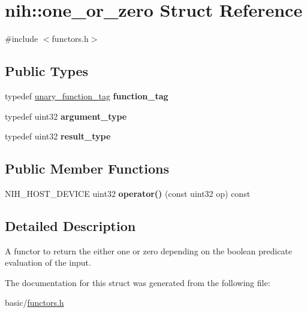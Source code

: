 \hypertarget{structnih_1_1one__or__zero}{
\section{nih\-:\-:one\-\_\-or\-\_\-zero \-Struct \-Reference}
\label{structnih_1_1one__or__zero}
}


{\ttfamily \#include $<$functors.\-h$>$}

\subsection*{\-Public \-Types}
\begin{DoxyCompactItemize}
\item 
\hypertarget{structnih_1_1one__or__zero_adfa13107d98491f997f9933f798d043c}{
typedef \hyperlink{structnih_1_1unary__function__tag}{unary\-\_\-function\-\_\-tag} {\bfseries function\-\_\-tag}}
\label{structnih_1_1one__or__zero_adfa13107d98491f997f9933f798d043c}

\item 
\hypertarget{structnih_1_1one__or__zero_a7ec2413701c61eceba542e7eba1fcc51}{
typedef uint32 {\bfseries argument\-\_\-type}}
\label{structnih_1_1one__or__zero_a7ec2413701c61eceba542e7eba1fcc51}

\item 
\hypertarget{structnih_1_1one__or__zero_a1e3e6481b463825b53447f7fee6d28cb}{
typedef uint32 {\bfseries result\-\_\-type}}
\label{structnih_1_1one__or__zero_a1e3e6481b463825b53447f7fee6d28cb}

\end{DoxyCompactItemize}
\subsection*{\-Public \-Member \-Functions}
\begin{DoxyCompactItemize}
\item 
\hypertarget{structnih_1_1one__or__zero_aa550b53e2c4bde687f9dd58fdca56033}{
\-N\-I\-H\-\_\-\-H\-O\-S\-T\-\_\-\-D\-E\-V\-I\-C\-E uint32 {\bfseries operator()} (const uint32 op) const }
\label{structnih_1_1one__or__zero_aa550b53e2c4bde687f9dd58fdca56033}

\end{DoxyCompactItemize}


\subsection{\-Detailed \-Description}
\-A functor to return the either one or zero depending on the boolean predicate evaluation of the input. 

\-The documentation for this struct was generated from the following file\-:\begin{DoxyCompactItemize}
\item 
basic/\hyperlink{functors_8h}{functors.\-h}\end{DoxyCompactItemize}
